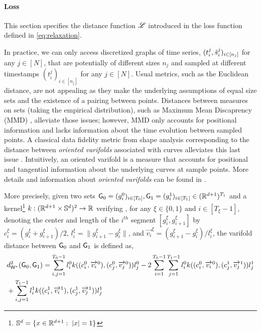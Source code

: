  



\vspace{-1ex}
\paragraph{Loss}

This section specifies the distance function $\mathscr{L}$ introduced in the loss function defined in \eqref{eq:relaxation}. 

In practice, we can only access discretized graphs of time series, $(t_i^j,\tilde{s}^j_i)_{i\in[n_j]}$ for any $j\in[N]$, that are potentially of 
different sizes $n_j$ and sampled at different timestamps $(t_i^j)_{i\in[n_j]}$ for any $j\in[N]$.
 Usual metrics, such as the Euclidean distance, are not appealing as they 
make the underlying assumptions of equal size sets and the existence of a pairing between points.
 Distances between measures on 
sets (taking the empirical distribution), such as Maximum Mean Discaprency (MMD) \cite{dziugaite2015training,borgwardt2006integrating}, alleviate those issues; however, MMD only accounts for positional information 
and lacks information about the time evolution between sampled points.
 A classical data fidelity metric from shape analysis 
corresponding to the distance between \textit{oriented varifolds} associated with curves alleviates this last issue \cite{kaltenmark2017general}.  
Intuitively, an oriented varifold is a measure that accounts for positional and tangential information about the underlying 
curves at sample points. More details and information about \textit{oriented varifolds} can be found in . 

More precisely, given two sets $\mathsf{G}_0=(g_i^0)_{i\in[T_0]},\mathsf{G}_1=(g_i^1)_{i\in[T_1]}\in (\mathbb{R}^{d+1})^{T_1}$ and a kernel\footnote{$\mathbb{S}^d=\{x\in\mathbb{R}^{d+1}:\; |x|=1\}$} $k:(\mathbb{R}^{d+1} \times \mathbb{S}^d)^2\to \mathbb{R}$
verifying \citep[Proposition 2 \& 4]{kaltenmark2017general}, for any $\xi\in\{0,1\}$ and $i\in[T_\xi-1]$, denoting the center and length of the $i^{th}$ segment $[g_i^\xi,g_{i+1}^\xi]$ by
$c_i^\xi = (g_i^\xi + g_{i+1}^\xi)/2$, $l_i^\xi = \| g_{i+1}^\xi-g_{i}^\xi\|$, and 
$\overrightarrow{v_i}^\xi = (g_{i+1}^\xi-g_{i}^\xi)/l_i^\xi$, the varifold distance between $\mathsf{G}_0$ and $\mathsf{G}_1$  is defined as,
\begin{align}
  &d_{\mathsf{W}^*}^2(\mathsf{G}_0,\mathsf{G}_1) = \sum_{i,j = 1}^{T_0-1}l^0_i k((c^0_i,\overrightarrow{v_i}^0),(c^0_j,\overrightarrow{v_j}^0))l^0_j
  - 2 \sum_{i=1}^{T_0-1}\sum_{j=1}^{T_1-1}l^0_i k((c^0_i,\overrightarrow{v_i}^0),(c^1_j,\overrightarrow{v_j}^1))l^1_j \\
  &+ \sum_{i,j = 1}^{T_1-1}l^1_i k((c^1_i,\overrightarrow{v_i}^1),(c^1_j,\overrightarrow{v_j}^1))l^1_j 
\end{align}

